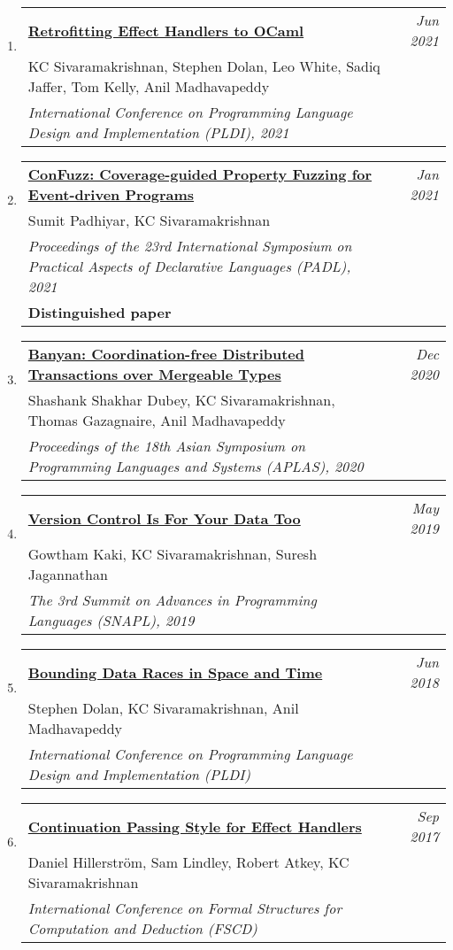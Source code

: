 \documentclass[10pt]{article}
\makeatletter
\newcommand{\lbar}[1]{{\color{#1}\ding{118}}\hspace*{2pt}}
\newenvironment{benumerate}[2]{
    \let\oldItem\item
    \def\item{\addtocounter{enumi}{-2}\oldItem}
    \begin{enumerate}[#2] \itemsep3pt
    \setcounter{enumi}{#1}
    \addtocounter{enumi}{1}}
  {\end{enumerate}}
\newenvironment{publication}[5]
{ \item
  \begin{tabular*}{7.5in}{p{6.3in}@{\extracolsep{\fill}}r}
    \href{#1}{\textbf{#2}} & \textit{#3}\\ #4 &\\ \textit{#5}&\\
  \end{tabular*}
} {}
\newenvironment{publicationNote}[6]
{ \item
  \begin{tabular*}{7.5in}{p{6.3in}@{\extracolsep{\fill}}r}
    \href{#1}{\textbf{#2}} & \textit{#3}\\ #4 &\\ \textit{#5}\\ \textbf{#6} \\
  \end{tabular*}
} {}
\newenvironment{region}[3]{%
  \vspace*{0.5ex}
  {\scalebox{1.4}{\textbf{#1}}}
  \begin{benumerate}{#3}{\color{RoyalBlue}#2}}
  {\end{benumerate}\vspace{0.8ex}}
\makeatother
\begin{document}
\begin{region} {\lbar{purple}Conference Publications}{{C}1}{14}

	\begin{publication} {https://kcsrk.info/papers/retro-concurrency_pldi_21.pdf}
		{Retrofitting Effect Handlers to OCaml}
		{Jun 2021} {KC Sivaramakrishnan, Stephen Dolan, Leo White, Sadiq Jaffer, Tom Kelly, Anil Madhavapeddy}
		{International Conference on Programming Language Design and Implementation (PLDI), 2021}
  \end{publication}

	\begin{publicationNote} {https://kcsrk.info/papers/confuzz_padl21.pdf}
		{ConFuzz: Coverage-guided Property Fuzzing for Event-driven Programs}
		{Jan 2021} {Sumit Padhiyar, KC Sivaramakrishnan}
		{Proceedings of the 23rd International Symposium on Practical Aspects of Declarative Languages (PADL), 2021}
    {Distinguished paper}
  \end{publicationNote}

	\begin{publication} {https://kcsrk.info/papers/banyan_aplas20.pdf}
		{Banyan: Coordination-free Distributed Transactions over Mergeable Types}
		{Dec 2020} {Shashank Shakhar Dubey, KC Sivaramakrishnan, Thomas Gazagnaire, Anil Madhavapeddy}
		{Proceedings of the 18th Asian Symposium on Programming Languages and Systems (APLAS), 2020}
  \end{publication}

	\begin{publication} {http://kcsrk.info/papers/snapl19-mrdt.pdf}
		{Version Control Is For Your Data Too}
		{May 2019} {Gowtham Kaki, KC Sivaramakrishnan, Suresh Jagannathan}
		{The 3rd Summit on Advances in Programming Languages (SNAPL), 2019}
  \end{publication}

	\begin{publication} {http://kcsrk.info/papers/pldi18-memory.pdf}
		{Bounding Data Races in Space and Time}
		{Jun 2018} {Stephen Dolan, KC Sivaramakrishnan, Anil Madhavapeddy}
		{International Conference on Programming Language Design and Implementation (PLDI)}
  \end{publication}

  \begin{publication} {http://kcsrk.info/papers/cps-handler-fscd17.pdf}
    {Continuation Passing Style for Effect Handlers}
    {Sep 2017} {Daniel Hillerström, Sam Lindley, Robert Atkey, KC Sivaramakrishnan}
    {International Conference on Formal Structures for Computation and Deduction (FSCD)}
  \end{publication}


\end{region}
\end{document}
